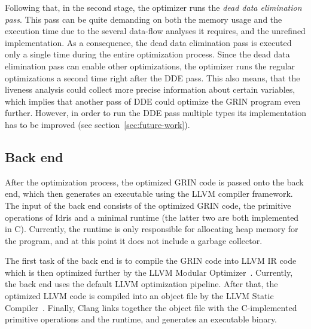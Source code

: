 \documentclass[main.tex]{subfiles}
\begin{document}
	Following that, in the second stage, the optimizer runs the \textit{dead data elimination pass}. This pass can be quite demanding on both the memory usage and the execution time due to the several data-flow analyses it requires, and the unrefined implementation. As a consequence, the dead data elimination pass is executed only a single time during the entire optimization process. Since the dead data elimination pass can enable other optimizations, the optimizer runs the regular optimizations a second time right after the DDE pass. This also means, that the liveness analysis could collect more precise information about certain variables, which implies that another pass of DDE could optimize the GRIN program even further. However, in order to run the DDE pass multiple types its implementation has to be improved (see section~\ref{sec:future-work}).
	
	\subsection{Back end}
	\label{subsec:llvm-back-end}
	
	After the optimization process, the optimized GRIN code is passed onto the back end, which then generates an executable using the LLVM compiler framework. The input of the back end consists of the optimized GRIN code, the primitive operations of Idris and a minimal runtime (the latter two are both implemented in C). Currently, the runtime is only responsible for allocating heap memory for the program, and at this point it does not include a garbage collector.
	
	The first task of the back end is to compile the GRIN code into LLVM IR code which is then optimized further by the LLVM Modular Optimizer~\cite{opt}. Currently, the back end uses the default LLVM optimization pipeline. After that, the optimized LLVM code is compiled into an object file by the LLVM Static Compiler~\cite{llc}. Finally, Clang links together the object file with the C-implemented primitive operations and the runtime, and generates an executable binary.
	
\end{document}
